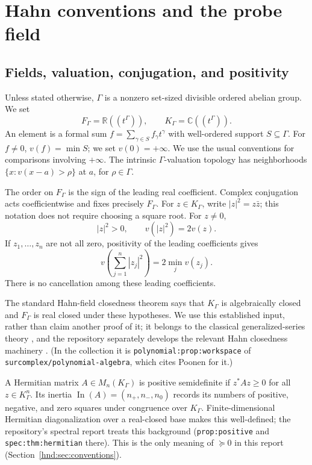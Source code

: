 \documentclass[11pt,oneside]{article}
\theoremstyle{definition}
\theoremstyle{remark}
\newcommand{\R}{\mathbb R}
\newcommand{\C}{\mathbb C}
\newcommand{\In}{\operatorname{In}}
\newcommand{\repo}[1]{\nolinkurl{#1}}%
\newcommand{\lbl}[1]{\nolinkurl{#1}}%
\begin{document}
\section{Hahn conventions and the probe field}\label{hnd:sec:hahn}

\subsection{Fields, valuation, conjugation, and positivity}

Unless stated otherwise, $\Gamma$ is a nonzero set-sized divisible
ordered abelian group. We set
\[
 F_\Gamma=\R((t^\Gamma)),\qquad K_\Gamma=\C((t^\Gamma)).
\]
An element is a formal sum $f=\sum_{\gamma\in S}f_\gamma t^\gamma$ with
well-ordered support $S\subseteq\Gamma$. For $f\ne0$,
$v(f)=\min S$; we set $v(0)=+\infty$. We use the usual conventions for
comparisons involving $+\infty$. The intrinsic $\Gamma$-valuation
topology has neighborhoods $\{x:v(x-a)>\rho\}$ at $a$, for
$\rho\in\Gamma$.

The order on $F_\Gamma$ is the sign of the leading real coefficient.
Complex conjugation acts coefficientwise and fixes precisely
$F_\Gamma$. For $z\in K_\Gamma$, write $|z|^2=z\bar z$; this notation
does not require choosing a square root. For $z\ne0$,
\begin{equation}\label{hnd:eq:normvaluation}
 |z|^2>0,\qquad v(|z|^2)=2v(z).
\end{equation}
If $z_1,\ldots,z_n$ are not all zero, positivity of the leading
coefficients gives
\begin{equation}\label{hnd:eq:sum-squares}
 v\!\left(\sum_{j=1}^n|z_j|^2\right)
 =2\min_j v(z_j).
\end{equation}
There is no cancellation among these leading coefficients.

The standard Hahn-field closedness theorem says that $K_\Gamma$ is
algebraically closed and $F_\Gamma$ is real closed under these
hypotheses. We use this established input, rather than claim another
proof of it; it belongs to the classical generalized-series theory
\cite{rayner}, and the repository separately develops the relevant Hahn
closedness machinery \cite{repo-map}. (In the collection it is
\lbl{polynomial:prop:workspace} of \repo{surcomplex/polynomial-algebra},
which cites Poonen for it.)

A Hermitian matrix $A\in M_n(K_\Gamma)$ is positive semidefinite if
$z^*Az\ge0$ for all $z\in K_\Gamma^n$. Its inertia
$\In(A)=(n_+,n_-,n_0)$ records its numbers of positive, negative, and
zero squares under congruence over $K_\Gamma$. Finite-dimensional
Hermitian diagonalization over a real-closed base makes this
well-defined; the repository's spectral report treats this background
\cite{repo-spectral} (\lbl{prop:positive} and \lbl{spec:thm:hermitian}
there). This is the only meaning of $\succeq0$ in this report
(Section~\ref{hnd:sec:conventions}).
\end{document}
